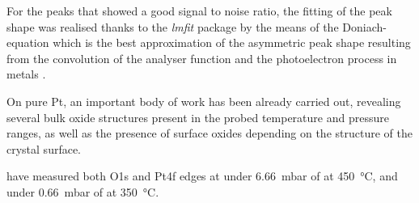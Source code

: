 For the peaks that showed a good signal to noise ratio, the fitting of the peak shape was realised thanks to the \textit{lmfit} \parencite{Newville2016} package by the means of the Doniach-equation which is the best approximation of the asymmetric peak shape resulting from the convolution of the analyser function and the photoelectron process in metals \parencite{Doniach1970}.

On pure Pt, an important body of work has been already carried out, revealing several bulk oxide structures present in the probed temperature and pressure ranges, as well as the presence of surface oxides depending on the structure of the crystal surface.

\cite{Miller2011} have measured both O1s and Pt4f edges at under \qty{6.66}{\milli\bar} of  at \qty{450}{\degreeCelsius}, and under \qty{0.66}{\milli\bar} of  at \qty{350}{\degreeCelsius}.